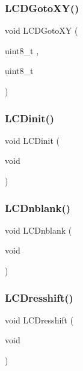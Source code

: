 \mbox{\label{lcd_8h_a75e4daec37f91765779baf65ee85a272}} 
\subsubsection{L\+C\+D\+Goto\+X\+Y()}
{\footnotesize\ttfamily void L\+C\+D\+Goto\+XY (\begin{DoxyParamCaption}\item[{uint8\+\_\+t}]{,  }\item[{uint8\+\_\+t}]{ }\end{DoxyParamCaption})}

\mbox{\label{lcd_8h_a6d4b16809305b1f89cff88c00862a12e}} 
\subsubsection{L\+C\+Dinit()}
{\footnotesize\ttfamily void L\+C\+Dinit (\begin{DoxyParamCaption}\item[{void}]{ }\end{DoxyParamCaption})}

\mbox{\label{lcd_8h_af944fa7a2c586706fd6320c098ecff9a}} 
\subsubsection{L\+C\+Dnblank()}
{\footnotesize\ttfamily void L\+C\+Dnblank (\begin{DoxyParamCaption}\item[{void}]{ }\end{DoxyParamCaption})}

\mbox{\label{lcd_8h_a0b68e2e9aa9dbaac6621c49e500f221e}} 
\subsubsection{L\+C\+Dresshift()}
{\footnotesize\ttfamily void L\+C\+Dresshift (\begin{DoxyParamCaption}\item[{void}]{ }\end{DoxyParamCaption})}

